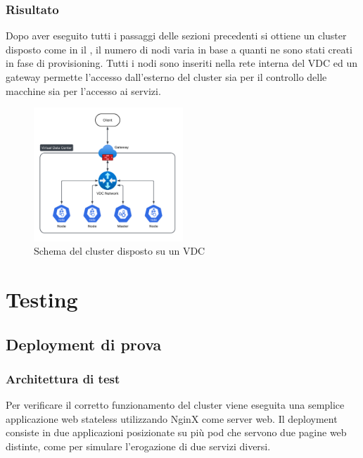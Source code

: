 \documentclass[12pt,a4paper,openright,twoside]{book}
\begin{document}
\subsection{Risultato}
\FloatBarrier
Dopo aver eseguito tutti i passaggi delle sezioni precedenti si ottiene un cluster disposto come in il , il numero di nodi varia in base a quanti ne sono stati creati in fase di provisioning.
Tutti i nodi sono inseriti nella rete interna del VDC ed un gateway permette l'accesso dall'esterno del cluster sia per il controllo delle macchine sia per l'accesso ai servizi.\\
\begin{figure}[!hbt]
    \centering
    \includegraphics[width=0.5\textwidth]{figures/kube-vdc.png}
    \caption{Schema del cluster disposto su un VDC}
    \label{fig:kube-cluster}
\end{figure}
\FloatBarrier
\chapter{Testing}
\section{Deployment di prova}
\subsection{Architettura di test}
\label{sec:test-depl}
Per verificare il corretto funzionamento del cluster viene eseguita una semplice applicazione web stateless utilizzando NginX come server web. Il deployment consiste in due applicazioni
posizionate su più pod che servono due pagine web distinte, come per simulare l'erogazione di due servizi diversi.
\end{document}
